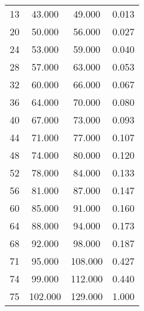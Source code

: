 % 
\begin{tabular}{cccc}
  \hline
  \hline
13 & 43.000 & 49.000 & 0.013 \\ 
  20 & 50.000 & 56.000 & 0.027 \\ 
  24 & 53.000 & 59.000 & 0.040 \\ 
  28 & 57.000 & 63.000 & 0.053 \\ 
  32 & 60.000 & 66.000 & 0.067 \\ 
  36 & 64.000 & 70.000 & 0.080 \\ 
  40 & 67.000 & 73.000 & 0.093 \\ 
  44 & 71.000 & 77.000 & 0.107 \\ 
  48 & 74.000 & 80.000 & 0.120 \\ 
  52 & 78.000 & 84.000 & 0.133 \\ 
  56 & 81.000 & 87.000 & 0.147 \\ 
  60 & 85.000 & 91.000 & 0.160 \\ 
  64 & 88.000 & 94.000 & 0.173 \\ 
  68 & 92.000 & 98.000 & 0.187 \\ 
  71 & 95.000 & 108.000 & 0.427 \\ 
  74 & 99.000 & 112.000 & 0.440 \\ 
  75 & 102.000 & 129.000 & 1.000 \\ 
   \hline
\end{tabular}
